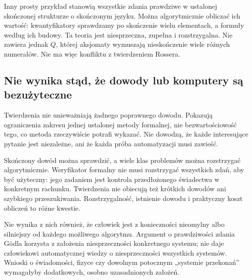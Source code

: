 \documentclass[11pt,a4paper]{article}
\numberwithin{equation}{section}
\theoremstyle{plain}
\theoremstyle{definition}
\theoremstyle{remark}
\begin{document}
Inny prosty przykład stanowią wszystkie zdania prawdziwe w ustalonej skończonej strukturze o skończonym języku. Można algorytmicznie obliczać ich wartość: kwantyfikatory sprawdzamy po skończenie wielu elementach, a formuły według ich budowy. Ta teoria jest niesprzeczna, zupełna i rozstrzygalna. Nie zawiera jednak $Q$, której aksjomaty wymuszają nieskończenie wiele różnych numerałów. Nie ma więc konfliktu z twierdzeniem Rossera.

\subsection*{Nie wynika stąd, że dowody lub komputery są bezużyteczne}\label{sec:19:2}
Twierdzenia nie unieważniają żadnego poprawnego dowodu. Pokazują ograniczenia zakresu jednej ustalonej metody formalnej, nie bezwartościowość tego, co metoda rzeczywiście potrafi wykazać. Nie dowodzą, że każde interesujące pytanie jest niezależne, ani że każda próba automatyzacji musi zawieść.

Skończony dowód można sprawdzić, a wiele klas problemów można rozstrzygać algorytmicznie. Weryfikator formalny nie musi rozstrzygać wszystkich zdań, aby być użyteczny: jego zadaniem jest kontrola przedłożonego świadectwa w konkretnym rachunku. Twierdzenia nie obiecują też krótkich dowodów ani szybkiego przeszukiwania. Rozstrzygalność, istnienie dowodu i praktyczny koszt obliczeń to różne kwestie.

Nie wynika z nich również, że człowiek jest z konieczności nieomylny albo silniejszy od każdego możliwego algorytmu. Argument o prawdziwości zdania Gödla korzysta z założenia niesprzeczności konkretnego systemu; nie daje człowiekowi automatycznej wiedzy o niesprzeczności wszystkich systemów. Wnioski o świadomości, fizyce czy dowolnym potocznym „systemie przekonań” wymagałyby dodatkowych, osobno uzasadnionych założeń.
\end{document}
